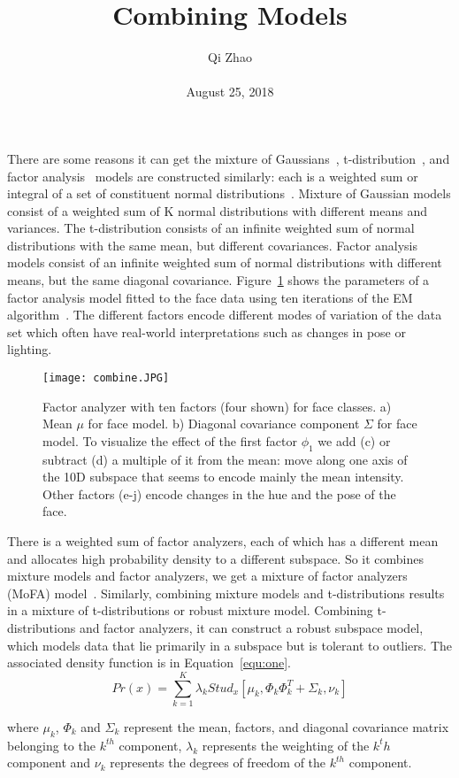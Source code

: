 \documentclass[10pt,twocolumn,letterpaper]{article}
\begin{document}
\title{ Combining Models}
\author{Qi Zhao\\\\August 25, 2018}

\maketitle
There are some reasons it can get the mixture of Gaussians~\cite{Dasgupta1999Learning}, t-distribution~\cite{Jones2010A}, and factor analysis~\cite{Akaike1987Factor} models are constructed similarly: each is a weighted sum or integral of a set of constituent normal distributions~\cite{Andrews1974Scale}. Mixture of Gaussian models consist of a weighted sum of K normal distributions with different means and variances. The t-distribution consists of an infinite weighted sum of normal distributions with the same mean, but different covariances. Factor analysis models consist of an infinite weighted sum of normal distributions with different means, but the same diagonal covariance. Figure~\ref{fig:one} shows the parameters of a factor analysis model fitted to the face data using ten iterations of the EM algorithm~\cite{DebashisKushary1997The}. The different factors encode different modes of variation of the data set which often have real-world interpretations such as changes in pose or lighting.
\begin{figure}[H]
\centering
\texttt{[image: combine.JPG]}
 \caption{ Factor analyzer with ten factors (four shown) for face classes. a) Mean $\mu$ for face model. b) Diagonal covariance component $\Sigma$ for face model. To visualize the effect of the first factor $\phi_1$ we add (c) or subtract (d) a multiple of it from the mean: move along one axis of the 10D subspace that seems to encode mainly the mean intensity. Other factors (e-j) encode changes in the hue and the pose of the face.}
\label{fig:one}
\end{figure}


There is a weighted sum of factor analyzers, each of which has a different mean and allocates high probability density to a different subspace. So it combines mixture models and factor analyzers, we get a mixture of factor analyzers (MoFA) model~\cite{Mclachlan2003Modelling}. Similarly, combining mixture models and t-distributions results in a mixture of t-distributions or robust mixture model.  Combining t-distributions and factor analyzers, it can construct a robust subspace model, which models data that lie primarily in a subspace but is tolerant to outliers. The associated density function is in Equation~\ref{equ:one}.
\begin{equation}\label{equ:one}
Pr(x) = \sum_{k = 1}^K\lambda_kStud_x[\mu_k, \Phi_k\Phi_k^T + \Sigma_k, \nu_k]
\end{equation}


where $\mu_k$, $\Phi_k$ and $\Sigma_k$ represent the mean, factors, and diagonal covariance matrix belonging to the $k^{th}$ component, $\lambda_k$ represents the weighting of the $k^th$ component and $\nu_k$ represents the degrees of freedom of the $k^{th}$ component.






{\small


}
\end{document}
